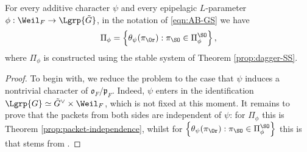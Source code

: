 \documentclass[a4paper,10pt]{article}
\begin{document}
\begin{theorem}\label{prop:Theta-compatibility}
	For every additive character $\psi$ and every epipelagic $L$-parameter $\phi: \Weil_F \to \Lgrp{\tilde{G}}$, in the notation of \eqref{eqn:AB-GS} we have
	\[ \Pi_\phi = \left\{ \theta_\psi(\pi_{\Or}) : \pi_{\SO} \in \Pi^{\SO}_\phi \right\}, \]
	where $\Pi_\phi$ is constructed using the stable system of Theorem \ref{prop:dagger-SS}.
\end{theorem}
\begin{proof}
	To begin with, we reduce the problem to the case that $\psi$ induces a nontrivial character of $\mathfrak{o}_F/\mathfrak{p}_F$. Indeed, $\psi$ enters in the identification $\Lgrp{G} \simeq \tilde{G}^\vee \times \Weil_F$, which is not fixed at this moment. It remains to prove that the packets from both sides are independent of $\psi$: for $\Pi_\phi$ this is Theorem \ref{prop:packet-independence}, whilst for $\left\{ \theta_\psi(\pi_{\Or}) : \pi_{\SO} \in \Pi^{\SO}_\phi \right\}$ this is \cite[Proposition 11.1]{GG} that stems from \cite[Theorem 12.1 (i)]{GS1}.


\end{proof}
\end{document}
